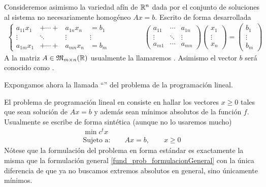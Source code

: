 Consideremos asimismo la variedad afín de $\mathbb{R}^n$ dada por el conjunto de soluciones al sistema no necesariamente homogéneo $Ax=b$. Escrito de forma desarrollada
\begin{equation*}
\begin{array}{cc}
\left\{\begin{array}{cccc}
a_{11}x_1&+\cdots+&a_{1n}x_n&=b_1\\
\vdots &\ddots &\vdots &\vdots\\
a_{1m}x_1&+\cdots+&a_{mn}x_n&=b_m
\end{array}\right.\qquad&\qquad\begin{pmatrix}
a_{11} & \cdots & a_{1n}\\
\vdots & \ddots & \vdots\\
a_{m1} & \cdots & a_{mn}
\end{pmatrix}\begin{pmatrix}
x_1\\
\vdots\\
x_n
\end{pmatrix}=\begin{pmatrix}
b_1\\
\vdots\\
b_m
\end{pmatrix}
\end{array}
\end{equation*}
A la matriz $A\in\mathfrak{M}_{m\times n}(\mathbb{R})$ usualmente la llamaremos . Asimismo el vector $b$ será conocido como .

Expongamos ahora la llamada ``'' del problema de la programación lineal.

\begin{prob}
El problema de programación lineal en  consiste en hallar los vectores $x\geq 0$ tales que sean solución de $Ax=b$ y además sean mínimos absolutos de la función $f$. Usualmente se escribe de forma sintética (aunque no lo usaremos mucho)
\begin{equation*}
\begin{array}{c}
\min c^tx\\
\text{Sujeto a:}\qquad Ax=b,\qquad x\geq 0
\end{array}
\end{equation*}
Nótese que la formulación del problema en forma estándar es exactamente la misma que la formulación general \ref{fund_prob_formulacionGeneral} con la única diferencia de que ya no buscamos extremos absolutos en general, sino únicamente mínimos. 
\end{prob}
